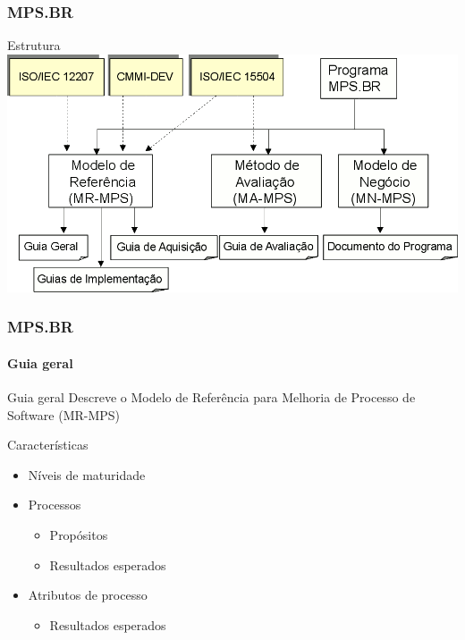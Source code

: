 \begin{frame}
	\frametitle{MPS.BR}
	
	\begin{block:fact}{Estrutura}
		\centering
		\includegraphics[width=\textwidth]{software-engineering/project-management/process/process-quality/mpsbr/structure}
	\end{block:fact}
\end{frame}



\begin{frame}
	\frametitle{MPS.BR}
	\framesubtitle{Guia geral}
	
	\begin{block:concept}{Guia geral}
		Descreve o Modelo de Referência para Melhoria de Processo de Software
		(MR-MPS)
	\end{block:concept}

	\begin{block:fact}{Características}
		\begin{itemize}
			\item Níveis de maturidade
			
			\item Processos
			\begin{itemize}
				\item Propósitos
				\item Resultados esperados
			\end{itemize}
			
			\item Atributos de processo
			\begin{itemize}
				\item Resultados esperados
			\end{itemize}
		\end{itemize}
	\end{block:fact}
	
\end{frame}



